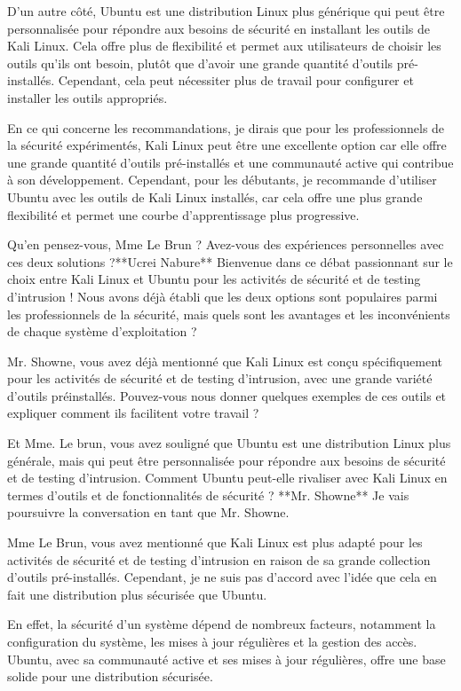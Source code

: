 D'un autre côté, Ubuntu est une distribution Linux plus générique qui peut être personnalisée pour répondre aux besoins de sécurité en installant les outils de Kali Linux. Cela offre plus de flexibilité et permet aux utilisateurs de choisir les outils qu'ils ont besoin, plutôt que d'avoir une grande quantité d'outils pré-installés. Cependant, cela peut nécessiter plus de travail pour configurer et installer les outils appropriés.

En ce qui concerne les recommandations, je dirais que pour les professionnels de la sécurité expérimentés, Kali Linux peut être une excellente option car elle offre une grande quantité d'outils pré-installés et une communauté active qui contribue à son développement. Cependant, pour les débutants, je recommande d'utiliser Ubuntu avec les outils de Kali Linux installés, car cela offre une plus grande flexibilité et permet une courbe d'apprentissage plus progressive.

Qu'en pensez-vous, Mme Le Brun ? Avez-vous des expériences personnelles avec ces deux solutions ?**Ucrei Nabure**
Bienvenue dans ce débat passionnant sur le choix entre Kali Linux et Ubuntu pour les activités de sécurité et de testing d'intrusion ! Nous avons déjà établi que les deux options sont populaires parmi les professionnels de la sécurité, mais quels sont les avantages et les inconvénients de chaque système d'exploitation ?

Mr. Showne, vous avez déjà mentionné que Kali Linux est conçu spécifiquement pour les activités de sécurité et de testing d'intrusion, avec une grande variété d'outils préinstallés. Pouvez-vous nous donner quelques exemples de ces outils et expliquer comment ils facilitent votre travail ?

Et Mme. Le brun, vous avez souligné que Ubuntu est une distribution Linux plus générale, mais qui peut être personnalisée pour répondre aux besoins de sécurité et de testing d'intrusion. Comment Ubuntu peut-elle rivaliser avec Kali Linux en termes d'outils et de fonctionnalités de sécurité ?
**Mr. Showne**
Je vais poursuivre la conversation en tant que Mr. Showne.

Mme Le Brun, vous avez mentionné que Kali Linux est plus adapté pour les activités de sécurité et de testing d'intrusion en raison de sa grande collection d'outils pré-installés. Cependant, je ne suis pas d'accord avec l'idée que cela en fait une distribution plus sécurisée que Ubuntu.

En effet, la sécurité d'un système dépend de nombreux facteurs, notamment la configuration du système, les mises à jour régulières et la gestion des accès. Ubuntu, avec sa communauté active et ses mises à jour régulières, offre une base solide pour une distribution sécurisée.

